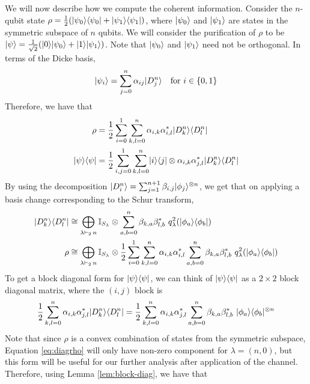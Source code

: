 \documentclass[11pt]{article}
\DeclarePairedDelimiter\bra{\langle}{\rvert}
\DeclarePairedDelimiter\ket{\lvert}{\rangle}
\begin{document}
We will now describe how we compute the coherent information. Consider the $n$-qubit state $\rho = \frac{1}{2} (\ket{\psi_0}\bra{\psi_0} + \ket{\psi_1}\bra{\psi_1})$, where $\ket{\psi_0}$ and $\ket{\psi_1}$ are states in the symmetric subspace of $n$ qubits. We will consider the purification of $\rho$ to be $\ket{\psi} = \frac{1}{\sqrt{2}}(\ket{0}\ket{\psi_0}+ \ket{1}\ket{\psi_1})$. Note that $\ket{\psi_0}$ and $\ket{\psi_1}$ need not be orthogonal. In terms of the Dicke basis,
 \begin{align*}
     \ket{\psi_i} &= \sum_{j = 0}^{n} \alpha_{ij} \ket{D_j^n}&\text{for $i \in \{0,1\}$}
 \end{align*}
 Therefore, we have that
 \begin{align*}
     \rho &= \frac{1}{2}\sum_{i=0}^1\sum_{k, l = 0}^{n} \alpha_{i, k}\alpha_{i, l}^{\ast} \ket{D_{k}^n}\bra{D_{l}^n} \\
     \ket{\psi}\bra{\psi} &= \frac{1}{2}\sum_{i, j = 0}^1 \sum_{k, l = 0}^{n} \ket{i}\bra{j} \otimes \alpha_{i, k}\alpha_{j, l}^\ast  \ket{D_{k}^n}\bra{D_{l}^n}
 \end{align*}
By using the decomposition $\ket{D_i^n} = \sum_{j=1}^{n+1} \beta_{i,j} \ket{\phi_j}^{\otimes n}$, we get that on applying a basis change corresponding to the Schur transform,
\begin{equation}
\begin{aligned}\label{eq:diagrho}
    \ket{D_{k}^n}\bra{D_{l}^n} &\cong \bigoplus_{\lambda \vdash_2\, n} \mathbb{I}_{S_{\lambda}} \otimes \sum_{a,b = 0}^{n} \beta_{k, a} \beta_{l, b}^\ast~q^2_{\lambda}(\ket{\phi_a}\bra{\phi_b}) \\
    \rho &\cong \bigoplus_{\lambda \vdash_2\, n} \mathbb{I}_{S_{\lambda}} \otimes \frac{1}{2}\sum_{i=0}^1\sum_{k, l = 0}^{n} \alpha_{i, k}\alpha_{i, l}^{\ast} \sum_{a, b = 0}^{n} \beta_{k, a} \beta_{l, b}^\ast~q^2_{\lambda}(\ket{\phi_a}\bra{\phi_b})
\end{aligned}
\end{equation}
To get a block diagonal form for $\ket{\psi}\bra{\psi}$, we can think of $\ket{\psi}\bra{\psi}$ as a $2 \times 2$ block diagonal matrix, where the $(i,j)$ block is
\begin{align*}
    \frac{1}{2}\sum_{k, l = 0}^{n} \alpha_{i, k}\alpha_{j, l}^\ast \ket{D_{k}^n}\bra{D_{l}^n} = \frac{1}{2}\sum_{k, l = 0}^{n} \alpha_{i, k}\alpha_{j, l}^\ast \sum_{a, b = 0}^{n} \beta_{k, a} \beta_{l, b}^\ast~\ket{\phi_a}\bra{\phi_b}^{\otimes n}
\end{align*}
Note that since $\rho$ is a convex combination of states from the symmetric subspace, Equation \ref{eq:diagrho} will only have non-zero component for $\lambda = (n, 0)$, but this form will be useful for our further analysis after application of the channel. Therefore, using Lemma \ref{lem:block-diag}, we have that
\end{document}
